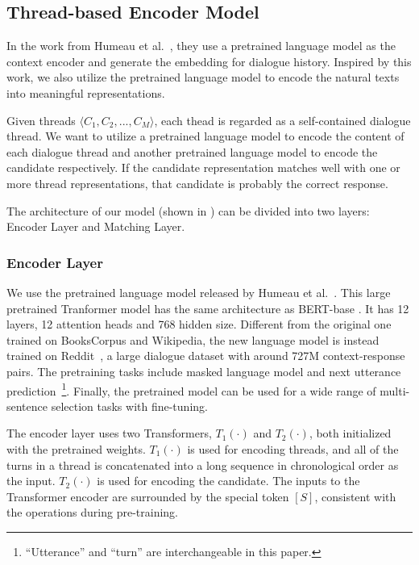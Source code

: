 \subsection{Thread-based Encoder Model}
\label{sec:tem}
In the work from Humeau et al.~, they use a pretrained language model as the context encoder and generate the embedding for dialogue history. Inspired by this work, we also utilize the pretrained language model to encode the natural texts into meaningful representations.

Given threads $\langle C_1, C_2, ..., C_M \rangle$, each thead is regarded as a self-contained dialogue thread. We want to utilize a pretrained language model to encode the content of each dialogue thread and another pretrained language model to encode the candidate respectively. 
If the candidate representation matches well with one or more thread representations, 
that candidate is probably the correct response. 

The architecture of our model (shown in ) can be divided into two layers: Encoder Layer and Matching Layer.

\subsubsection{Encoder Layer}
We use the pretrained language model released by Humeau et al.~. This large pretrained Tranformer model has the same architecture as BERT-base \cite{DevlinCLT19}. It has 12 layers, 12 attention heads and 768 hidden size. Different from the original one trained on BooksCorpus and Wikipedia, the new language model is instead trained on Reddit~\cite{abs-1904-06472}, a large dialogue dataset with around 727M context-response pairs. The pretraining tasks include masked language model and next utterance prediction~\footnote{``Utterance'' and ``turn'' are 
interchangeable in this paper.}. Finally, the pretrained model can be used for 
a wide range of multi-sentence selection tasks with fine-tuning.

The encoder layer uses two Transformers, $T_1(\cdot)$ and $T_2(\cdot)$, both initialized with the pretrained weights. $T_1(\cdot)$ is used for encoding threads, and all of the turns in a thread is concatenated into a long sequence in chronological order as the input. 
$T_2(\cdot)$ is used for encoding the candidate. The inputs to the 
Transformer encoder are surrounded by the special token $[S]$, 
consistent with the operations during pre-training.

